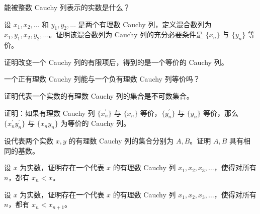 \newpage
\noindent\begin{minipage}{\textwidth}
能被整数 Cauchy 列表示的实数是什么？
\end{minipage}\par\vfill
\noindent\begin{minipage}{\textwidth}
设 $x_1,x_2,\ldots$ 和 $y_1,y_2,\ldots$ 是两个有理数 Cauchy 列，定义混合数列为 $x_1,y_1,x_2,y_2,\ldots$。证明该混合数列为 Cauchy 列的充分必要条件是 $\{x_n\}$ 与 $\{y_n\}$ 等价。
\end{minipage}\par\vfill
\noindent\begin{minipage}{\textwidth}
证明改变一个 Cauchy 列的有限项后，得到的是一个等价的 Cauchy 列。
\end{minipage}\par\vfill
\noindent\begin{minipage}{\textwidth}
一个正有理数 Cauchy 列能与一个负有理数 Cauchy 列等价吗？
\end{minipage}\par\vfill
\newpage
\noindent\begin{minipage}{\textwidth}
证明代表一个实数的有理数 Cauchy 列的集合是不可数集合。
\end{minipage}\par\vfill
\noindent\begin{minipage}{\textwidth}
证明：如果有理数 Cauchy 列 $\{x_n^{\prime}\}$ 与 $\{x_n\}$ 等价，$\{y_n^{\prime}\}$ 与 $\{y_n\}$ 等价，那么 $\{x_n^{\prime}y_n^{\prime}\}$ 与 $\{x_ny_n\}$ 为等价的 Cauchy 列。
\end{minipage}\par\vfill
\noindent\begin{minipage}{\textwidth}
设代表两个实数 $x,y$ 的有理数 Cauchy 列的集合分别为 $A,B$。证明 $A,B$ 具有相同的基数。
\end{minipage}\par\vfill
\noindent\begin{minipage}{\textwidth}
设 $x$ 为实数，证明存在一个代表 $x$ 的有理数 Cauchy 列 $x_1,x_2,x_3,\ldots$，使得对所有 $n$，都有 $x_n<x$。
\end{minipage}\par\vfill
\newpage
\noindent\begin{minipage}{\textwidth}
设 $x$ 为实数，证明存在一个代表 $x$ 的有理数 Cauchy 列 $x_1,x_2,x_3,\ldots$，使得对所有 $n$，都有 $x_n<x_{n+1}$。
\end{minipage}\par\vfill
